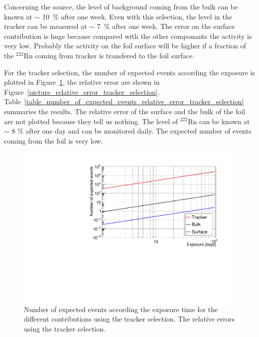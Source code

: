 \documentclass[main.tex]{subfiles}
\begin{document}
\bigskip

\noindent Concerning the source, the level of background coming from the bulk can be known at $\sim$ 10~\% after one week. Even with this selection, the level in the tracker can be measured at  $\sim$ 7~\% after one week. The error on the surface contribution is huge because compared with the other componants the activity is very low. Probably the activity on the foil surface will be higher if a fraction of the $^{\text{222}}$Rn coming from tracker is transfered to the foil surface. 


\FloatBarrier
\bigskip


\noindent For the tracker selection, the number of expected events according the exposure is plotted in Figure~\ref{picture_number_of_expected_events_tracker_selection}, the relative error are shown in Figure~\ref{picture_relative_error_tracker_selection}. Table~\ref{table_number_of_expected_events_relative_error_tracker_selection} summaries the results. The relative error of the surface and the bulk of the foil are not plotted because they tell us nothing. The level of $^{\text{222}}$Rn can be known at $\sim$ 8 \% after one day and can be monitored daily. The expected number of events coming from the foil is very low.


\begin{figure}[h!]
\begin{center}
\includegraphics[scale=0.5]{pictures/Chap5/nexpected_tracker_selection.pdf}
\caption{Number of expected events according the exposure time for the different contributions using the tracker selection. The relative errors using the tracker selection.}
\label{picture_number_of_expected_events_tracker_selection}
\end{center}
\end{figure}
\end{document}

